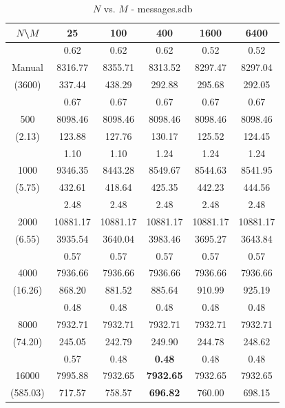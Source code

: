 \begin{table}[th]
\caption{$N$ vs. $M$ - messages.sdb}
\label{tab:messages.sdb}
\centering
\begin{tabular}{|c||c|c|c|c|c|}
\hline
$N$\textbackslash $M$& 25 & 100 & 400 & 1600 & 6400 \\ \hline \hline
       & 0.62    & 0.62    & 0.62    & 0.52    & 0.52  \\ 
Manual & 8316.77 & 8355.71 & 8313.52 & 8297.47 & 8297.04 \\
(3600) & 337.44  & 438.29  & 292.88  & 295.68  & 292.05 \\\hline
  & 0.67 & 0.67 & 0.67 & 0.67 & 0.67\\
500  & 8098.46 & 8098.46 & 8098.46 & 8098.46 & 8098.46\\ 
(2.13)  & 123.88 & 127.76 & 130.17 & 125.52 & 124.45\\ \hline 
  & 1.10 & 1.10 & 1.24 & 1.24 & 1.24\\ 
1000  & 9346.35 & 8443.28 & 8549.67 & 8544.63 & 8541.95\\ 
(5.75)  & 432.61 & 418.64 & 425.35 & 442.23 & 444.56\\ \hline 
  & 2.48 & 2.48 & 2.48 & 2.48 & 2.48\\ 
2000  & 10881.17 & 10881.17 & 10881.17 & 10881.17 & 10881.17\\ 
(6.55)  & 3935.54 & 3640.04 & 3983.46 & 3695.27 & 3643.84\\ \hline 
  & 0.57 & 0.57 & 0.57 & 0.57 & 0.57\\ 
4000  & 7936.66 & 7936.66 & 7936.66 & 7936.66 & 7936.66\\ 
(16.26)  & 868.20 & 881.52 & 885.64 & 910.99 & 925.19\\ \hline 
  & 0.48 & 0.48 & 0.48 & 0.48 & 0.48\\ 
8000  & 7932.71 & 7932.71 & 7932.71 & 7932.71 & 7932.71\\ 
(74.20)  & 245.05 & 242.79 & 249.90 & 244.78 & 248.62\\ \hline 
  & 0.57 & 0.48 & {\bf 0.48} & 0.48 & 0.48\\ 
16000  & 7995.88 & 7932.65 & {\bf 7932.65} & 7932.65 & 7932.65\\ 
(585.03)  & 717.57 & 758.57 & {\bf 696.82} & 760.00 & 698.15\\ \hline 
\end{tabular}
\end{table}

